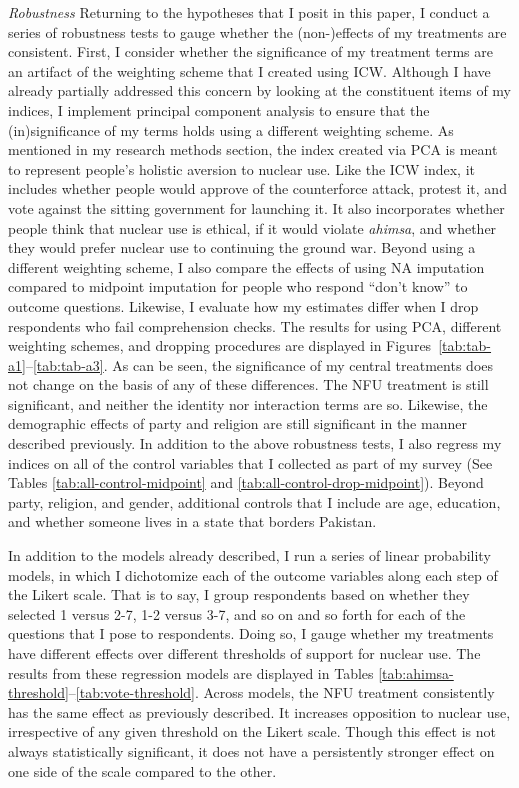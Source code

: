 \documentclass[12pt]{article}
\begin{document}
\textit{Robustness}  Returning to the hypotheses that I posit in this paper, I conduct a series of robustness tests to gauge whether the (non-)effects of my treatments are consistent. First, I consider whether the significance of my treatment terms are an artifact of the weighting scheme that I created using ICW. Although I have already partially addressed this concern by looking at the constituent items of my indices, I implement principal component analysis to ensure that the (in)significance of my terms holds using a different weighting scheme. As mentioned in my research methods section, the index created via PCA is meant to represent people's holistic aversion to nuclear use. Like the ICW index, it includes whether people would approve of the counterforce attack, protest it, and vote against the sitting government for launching it. It also incorporates whether people think that nuclear use is ethical, if it would violate \textit{ahimsa}, and whether they would prefer nuclear use to continuing the ground war. Beyond using a different weighting scheme, I also compare the effects of using NA imputation compared to midpoint imputation for people who respond “don't know” to outcome questions. Likewise, I evaluate how my estimates differ when I drop respondents who fail comprehension checks. The results for using PCA, different weighting schemes, and dropping procedures are displayed in Figures~\ref{tab:tab-a1}--\ref{tab:tab-a3}. As can be seen, the significance of my central treatments does not change on the basis of any of these differences. The NFU treatment is still significant, and neither the identity nor interaction terms are so. Likewise, the demographic effects of party and religion are still significant in the manner described previously. In addition to the above robustness tests, I also regress my indices on all of the control variables that I collected as part of my survey (See Tables \ref{tab:all-control-midpoint} and \ref{tab:all-control-drop-midpoint}). Beyond party, religion, and gender, additional controls that I include are age, education, and whether someone lives in a state that borders Pakistan.

In addition to the models already described, I run a series of linear probability models, in which I dichotomize each of the outcome variables along each step of the Likert scale. That is to say, I group respondents based on whether they selected 1 versus 2-7, 1-2 versus 3-7, and so on and so forth for each of the questions that I pose to respondents. Doing so, I gauge whether my treatments have different effects over different thresholds of support for nuclear use. The results from these regression models are displayed in Tables \ref{tab:ahimsa-threshold}--\ref{tab:vote-threshold}. Across models, the NFU treatment consistently has the same effect as previously described. It increases opposition to nuclear use, irrespective of any given threshold on the Likert scale. Though this effect is not always statistically significant, it does not have a persistently stronger effect on one side of the scale compared to the other. 
\end{document}
